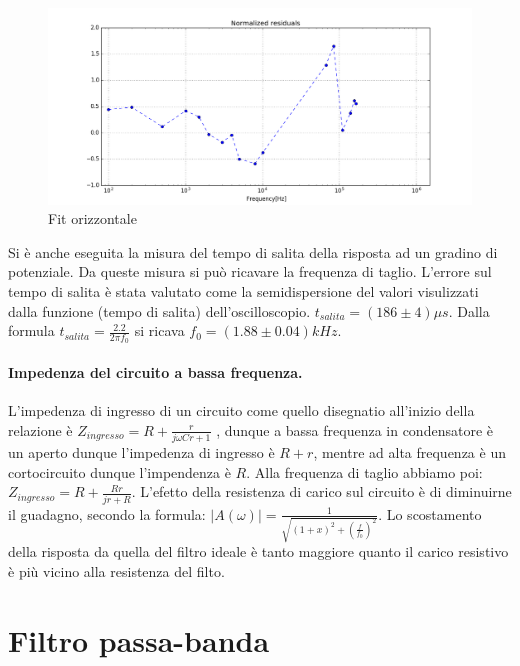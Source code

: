 \documentclass[10pt,a4paper]{article}
\begin{document}
\begin{itemize}
\begin{figure}[h]
\centering
\includegraphics[scale=0.4]{fitbassoresiduo.png}
\caption{Fit orizzontale}
\end{figure}

\end{itemize}

Si è anche eseguita la misura del tempo di salita della risposta ad un gradino di potenziale. Da queste misura si può ricavare la frequenza di taglio. L'errore sul tempo di salita è stata valutato come la semidispersione del valori visulizzati dalla funzione (tempo di salita) dell'oscilloscopio. $t_{salita} = (186 \pm 4) \mu s$. Dalla formula $t_{salita} = \frac{2.2}{2 \pi f_0}$ si ricava $f_0 = (1.88 \pm 0.04) kHz$.

\paragraph{Impedenza del circuito a bassa frequenza.}
L'impedenza di ingresso di un circuito come quello disegnatio all'inizio della relazione è $Z_{ingresso} = R+\frac{r}{j \omega C r+1}$ , dunque a bassa frequenza in condensatore è un aperto dunque l'impedenza di ingresso è $R+r$, mentre ad alta frequenza è un cortocircuito dunque l'impendenza è $R$. Alla frequenza di taglio abbiamo poi: $Z_{ingresso} = R + \frac{Rr}{jr+R}$. L'efetto della resistenza di carico sul circuito è di diminuirne il guadagno, secondo la formula: $\vert A(\omega) \vert = \frac{1}{\sqrt{(1+x)^2+(\frac{f}{f_{0}})^2}} $.
Lo scostamento della risposta da quella del filtro ideale è tanto maggiore quanto il carico resistivo è più vicino alla resistenza del filto.

\section{Filtro passa-banda}
\end{document}
